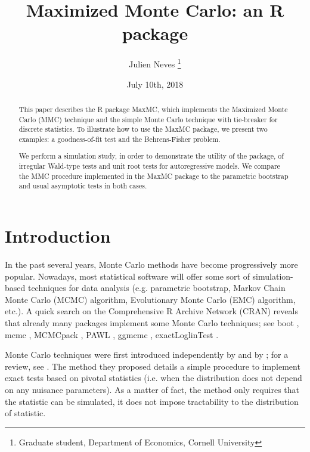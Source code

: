 \documentclass[]{article}\usepackage[]{graphicx}\usepackage[]{color}
\newcommand{\pkg}[1]{{\normalfont\fontseries{b}\selectfont #1}}
\let\proglang=\textsf
\begin{document}
\title{Maximized Monte Carlo: an \proglang{R} package}
\author{Julien Neves \thanks{Graduate student, Department of Economics, Cornell University}}
\date{July 10th, 2018}

\maketitle

\begin{abstract}
	This paper describes the \proglang{R} package \pkg{MaxMC}, which implements the Maximized Monte Carlo (MMC) technique and the simple Monte Carlo technique with tie-breaker for discrete statistics. To illustrate how to use the \pkg{MaxMC} package, we present two examples: a goodness-of-fit test and the Behrens-Fisher problem.

	We perform a simulation study, in order to demonstrate the utility of the package, of irregular Wald-type tests and unit root tests for autoregressive models. We compare the MMC procedure implemented in the \pkg{MaxMC} package to the parametric bootstrap and usual asymptotic tests in both cases.
\end{abstract}

\clearpage

\tableofcontents

\clearpage

\section{Introduction}
\label{intro}

In the past several years, Monte Carlo methods have become progressively more popular. Nowadays, most statistical software will offer some sort of simulation-based techniques for data analysis (e.g. parametric bootstrap, Markov Chain Monte Carlo (MCMC) algorithm, Evolutionary Monte Carlo (EMC) algorithm, etc.). A quick search on the Comprehensive \proglang{R} Archive Network (CRAN) reveals that already many packages implement some Monte Carlo techniques; see \pkg{boot} \citep{canty_boot:_2016}, \pkg{mcmc} \citep{geyer_mcmc:_2015}, \pkg{MCMCpack} \citep{martin_mcmcpack:_2011}, \pkg{PAWL} \citep{bornn_pawl:_2012}, \pkg{ggmcmc} \citep{fernandez-i-marin_ggmcmc:_2016}, \pkg{exactLoglinTest} \citep{caffo_exactloglintest:_2013}.

Monte Carlo techniques were first introduced independently by \cite{dwass_modified_1957} and by \cite{barnard_comment_1963}; for a review, see \cite{dufour_monte_2003}. The method they proposed details a simple procedure to implement exact tests based on pivotal statistics (i.e. when the distribution does not depend on any nuisance parameters). As a matter of fact, the method only requires that the statistic can be simulated, it does not impose tractability to the distribution of statistic.
\end{document}
